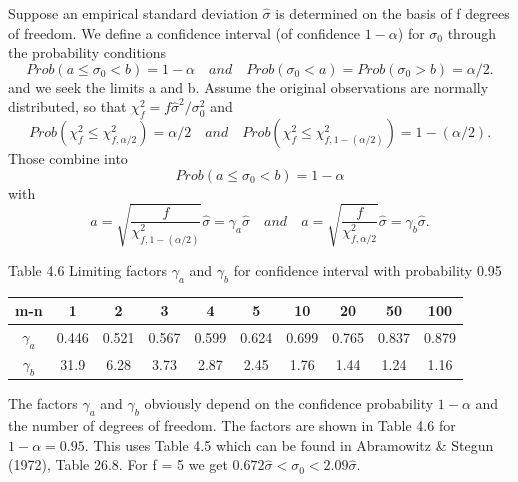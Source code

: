 	
	Suppose an empirical standard deviation $\hat{\sigma}$ is determined on the basis of f degrees
	of freedom. We define a confidence interval (of confidence $1-\alpha$) for $\sigma_0$ through the probability conditions
	\begin{equation*}
	Prob(a\leq \sigma_0 <b)=1-\alpha \quad and \quad Prob(\sigma_0 <a)=Prob(\sigma_0 >b)=\alpha/2.
	\end{equation*}
	and we seek the limits a and b. Assume the original observations are normally distributed,
	so that $\chi^2_f=f\hat{\sigma}^2/\sigma^2_0$ and
	\begin{equation*}
	Prob(\chi^2_f\leq \chi^2_{f,\alpha/2})=\alpha/2 \quad and \quad 	
	Prob(\chi^2_f\leq \chi^2_{f,1-(\alpha/2)})=1-(\alpha/2).
	\end{equation*}
	Those combine into
	\begin{equation*}
	Prob(a\leq \sigma_0 <b)=1-\alpha
	\end{equation*}
	with
	\begin{equation*}
	a=\sqrt{\frac{f}{\chi^2_{f,1-(\alpha/2)}}}\hat{\sigma}=\gamma_a\hat{\sigma} 
		\quad and \quad 
	a=\sqrt{\frac{f}{\chi^2_{f,\alpha/2}}}\hat{\sigma}=\gamma_b\hat{\sigma}.	
	\end{equation*}
	
	\begin{table}
		Table 4.6 Limiting factors $\gamma_a$ and $\gamma_b$ for confidence interval with probability 0.95\\
		\centering
		\begin{tabular}{cccccccccc}
			\hline 
			m-n & 1 & 2 & 3 & 4 & 5 & 10 & 20 & 50 & 100 \\ 
			\hline
			$\gamma _a$ & 0.446 & 0.521 & 0.567 & 0.599 & 0.624 & 0.699 & 0.765 & 0.837 & 0.879 \\ 

			$\gamma _b$ & 31.9 & 6.28 & 3.73 & 2.87 & 2.45 & 1.76 & 1.44 & 1.24 & 1.16 \\ 
			\hline 
		\end{tabular} 
	\end{table}

	
	The factors $\gamma_a$ and $\gamma_b$  obviously depend on the confidence probability $1-\alpha$ and the number of degrees of freedom. The factors are shown in Table 4.6 for $1-\alpha=0.95$. This uses Table 4.5 which can be found in Abramowitz \& Stegun (1972), Table 26.8. For f = 5 we get $0.672\hat{\sigma}<\sigma_0<2.09\hat{\sigma}$.
	
